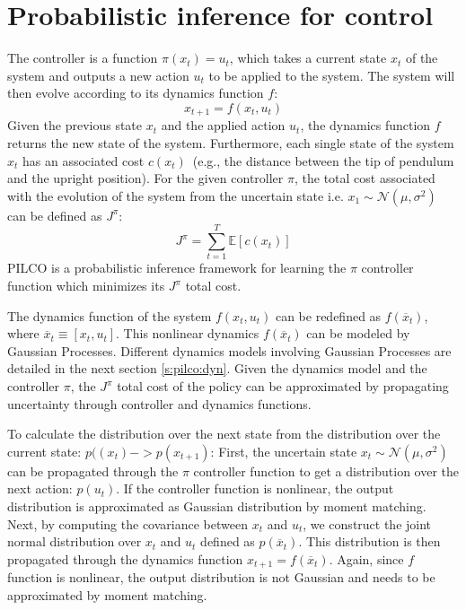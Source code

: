 \section{Probabilistic inference for control}
\label{s:pilco}
The controller is a function $\pi(x_{t})=u_{t}$, which takes a current state $x_{t}$ of the system and outputs a new action $u_{t}$ to be applied to the system. The system will then evolve according to its dynamics function $f$:
\begin{equation}
x_{t+1}=f(x_{t}, u_{t})
\end{equation}
Given the previous state $x_{t}$ and the applied action $u_{t}$, the dynamics function $f$ returns the new state of the system. Furthermore, each single state of the system $x_{t}$ has an associated cost $c(x_{t})$\ (e.g., the distance between the tip of pendulum and the upright position). For the given controller $\pi$, the total cost associated with the evolution of the system from the uncertain state i.e. $x_{1} \sim \mathcal{N}(\mu, \sigma^2)$ can be defined as $J^{\pi}$:
\begin{equation}
J^{\pi}=\sum_{t=1}^{T} \mathbb{E}[c(x_{t})]
\end{equation}
PILCO \cite{deisenroth2011pilco} is a probabilistic inference framework for learning the $\pi$ controller function which minimizes its $J^{\pi}$ total cost. 

\noindent The dynamics function of the system $f(x_{t}, u_{t})$ can be redefined as $f(\overline{x}_{t})$, where $\overline{x}_{t} \equiv [x_{t}, u_{t}]$. This nonlinear dynamics $f(\overline{x}_{t})$ can be modeled by Gaussian Processes. Different dynamics models involving Gaussian Processes are detailed in the next section \ref{s:pilco:dyn}. Given the dynamics model and the controller $\pi$, the $J^{\pi}$ total cost of the policy can be approximated by propagating uncertainty \cite{candela2003propagation} through controller and dynamics functions. 

\noindent To calculate the distribution over the next state  from the distribution over the current state: $p((x_{t}) -> p(x_{t+1})$: First, the uncertain state $x_{t} \sim \mathcal{N}(\mu, \sigma^2)$ can be propagated through the $\pi$ controller function to get a distribution over the next action: $p(u_{t})$. If the controller function is nonlinear, the output distribution is approximated as Gaussian distribution by moment matching. Next, by computing the covariance between $x_{t}$ and $u_{t}$, we construct the joint normal distribution over $x_{t}$ and $u_{t}$ defined as $p(\overline{x}_{t})$. This distribution is then propagated through the dynamics function $x_{t+1}=f(\overline{x}_{t})$. Again, since $f$ function is nonlinear, the output distribution is not Gaussian and needs to be approximated by moment matching. 

